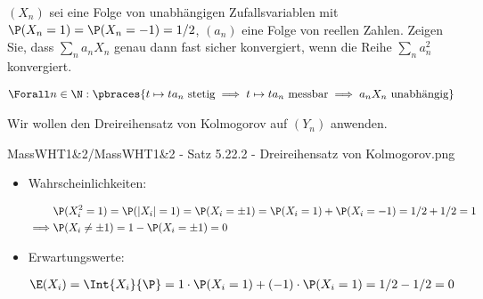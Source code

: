 
\begin{exercise}

$(X_n)$ sei eine Folge von unabhängigen Zufallsvariablen mit $\P(X_n = 1) = \P(X_n = -1) = 1/2$, $(a_n)$ eine Folge von reellen Zahlen.
Zeigen Sie, dass $\sum_n a_n X_n$ genau dann fast sicher konvergiert, wenn die Reihe $\sum_n a_n^2$ konvergiert.

\end{exercise}


\begin{solution}

\begin{align*}
    \Forall n \in \N:
    \pbraces
    {
        t \mapsto t a_n ~\text{stetig}
        \implies
        t \mapsto t a_n ~\text{messbar}
        \implies
        a_n X_n ~\text{unabhängig}
    }
\end{align*}

Wir wollen den Dreireihensatz von Kolmogorov auf $(Y_n)$ anwenden.

{MassWHT1&2/MassWHT1&2 - Satz 5.22.2 - Dreireihensatz von Kolmogorov.png}

\begin{itemize}

    \item Wahrscheinlichkeiten:
    
    \begin{align*}
        &
        \P(X_i^2 = 1)
        =
        \P(|X_i| = 1)
        =
        \P(X_i = \pm 1)
        =
        \P(X_i = 1) + \P(X_i = -1)
        =
        1/2 + 1/2
        =
        1 \\
        \implies &
        \P(X_i \neq \pm 1)
        =
        1 - \P(X_i = \pm 1)
        =
        0
    \end{align*}

    \item Erwartungswerte:
    
    \begin{align*}
        \E(X_i)
        =
        \Int{X_i}{\P}
        =
        1 \cdot \P(X_i = 1) + (-1) \cdot \P(X_i = 1)
        =
        1/2 - 1/2
        =
        0
    \end{align*}


\end{itemize}
\end{solution}
